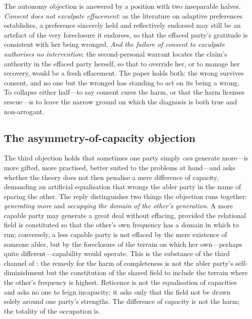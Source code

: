 \begin{claim}
The autonomy objection is answered by a position with two inseparable halves. \emph{Consent does not exculpate effacement}: as the literature on adaptive preferences establishes, a preference sincerely held and reflectively endorsed may still be an artefact of the very foreclosure it endorses, so that the effaced party's gratitude is consistent with her being wronged. \emph{And the failure of consent to exculpate authorises no intervention}: the second-personal warrant locates the claim's authority in the effaced party herself, so that to override her, or to manage her recovery, would be a fresh effacement. The paper holds both: the wrong survives consent, and no one but the wronged has standing to act on its being a wrong. To collapse either half---to say consent cures the harm, or that the harm licenses rescue---is to leave the narrow ground on which the diagnosis is both true and non-arrogant.
\end{claim}

\subsection{The asymmetry-of-capacity objection}
\label{p18:sub:obj-capacity}
The third objection holds that sometimes one party simply \emph{can} generate more---is more gifted, more practised, better suited to the problems at hand---and asks whether the theory does not then penalise a mere difference of capacity, demanding an artificial equalisation that wrongs the abler party in the name of sparing the other. The reply distinguishes two things the objection runs together: \emph{generating more} and \emph{occupying the domain of the other's generation}. A more capable party may generate a great deal without effacing, provided the relational field is constituted so that the other's own frequency has a domain in which to run; conversely, a less capable party is not effaced by the mere existence of someone abler, but by the foreclosure of the terrain on which her own---perhaps quite different---capability would operate. This is the substance of the third channel of : the remedy for the harm of completeness is not the abler party's self-diminishment but the constitution of the shared field to include the terrain where the other's frequency is highest. Reticence is not the equalisation of capacities and asks no one to feign incapacity; it asks only that the field not be drawn solely around one party's strengths. The difference of capacity is not the harm; the totality of the occupation is.

